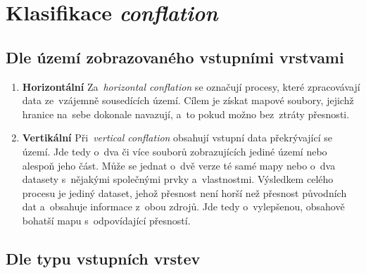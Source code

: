 \section{Klasifikace \textit{conflation}}
\label{klasifikace}

\subsection{Dle území zobrazovaného vstupními vrstvami}
\label{dle-uzemi}
\nopagebreak
\begin{enumerate}
  \item \textbf{Horizontální} 
    \subitem Za~\textit{horizontal conflation} se označují procesy, které 
	zpracovávají data ze~vzájemně sousedících území. Cílem je získat 
	mapové soubory, jejichž hranice na~sebe dokonale navazují, a~to pokud 
	možno bez~ztráty přesnosti.
  \item \textbf{Vertikální} \nopagebreak
    \subitem Při~\textit{vertical conflation} obsahují vstupní data překrývající
	se území. Jde tedy o~dva či více souborů zobrazujících jediné území nebo
	alespoň jeho část. Může se jednat o~dvě verze té samé mapy nebo 
	o~dva datasety s~nějakými společnými prvky a~vlastnostmi. Výsledkem 
	celého procesu je jediný dataset, jehož přesnost není horší než přesnost
	původních dat a~obsahuje informace z~obou zdrojů. Jde tedy o~vylepšenou, 
	obsahově bohatší mapu s~odpovídající přesností. 
\end{enumerate}

\subsection{Dle typu vstupních vrstev}
\label{dle-vstupu}

